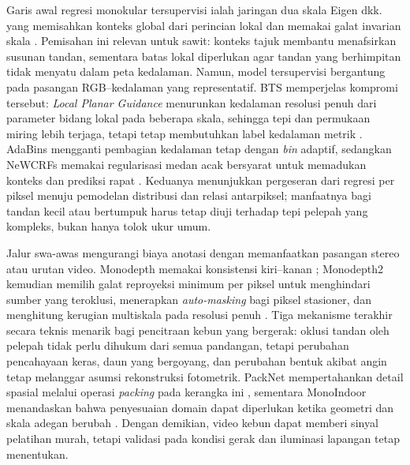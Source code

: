 Garis awal regresi monokular tersupervisi ialah jaringan dua skala Eigen dkk. yang memisahkan konteks global dari perincian lokal dan memakai galat invarian skala \cite{eigen2014depth}. Pemisahan ini relevan untuk sawit: konteks tajuk membantu menafsirkan susunan tandan, sementara batas lokal diperlukan agar tandan yang berhimpitan tidak menyatu dalam peta kedalaman. Namun, model tersupervisi bergantung pada pasangan RGB--kedalaman yang representatif. BTS memperjelas kompromi tersebut: \textit{Local Planar Guidance} menurunkan kedalaman resolusi penuh dari parameter bidang lokal pada beberapa skala, sehingga tepi dan permukaan miring lebih terjaga, tetapi tetap membutuhkan label kedalaman metrik \cite{lee2019bts}. AdaBins mengganti pembagian kedalaman tetap dengan \textit{bin} adaptif, sedangkan NeWCRFs memakai regularisasi medan acak bersyarat untuk memadukan konteks dan prediksi rapat \cite{bhat2021adabins,yuan2022newcrfs}. Keduanya menunjukkan pergeseran dari regresi per piksel menuju pemodelan distribusi dan relasi antarpiksel; manfaatnya bagi tandan kecil atau bertumpuk harus tetap diuji terhadap tepi pelepah yang kompleks, bukan hanya tolok ukur umum.

Jalur swa-awas mengurangi biaya anotasi dengan memanfaatkan pasangan stereo atau urutan video. Monodepth memakai konsistensi kiri--kanan \cite{godard2017monodepth}; Monodepth2 kemudian memilih galat reproyeksi minimum per piksel untuk menghindari sumber yang teroklusi, menerapkan \textit{auto-masking} bagi piksel stasioner, dan menghitung kerugian multiskala pada resolusi penuh \cite{godard2019monodepth2}. Tiga mekanisme terakhir secara teknis menarik bagi pencitraan kebun yang bergerak: oklusi tandan oleh pelepah tidak perlu dihukum dari semua pandangan, tetapi perubahan pencahayaan keras, daun yang bergoyang, dan perubahan bentuk akibat angin tetap melanggar asumsi rekonstruksi fotometrik. PackNet mempertahankan detail spasial melalui operasi \textit{packing} pada kerangka ini \cite{guizilini2020packnet}, sementara MonoIndoor menandaskan bahwa penyesuaian domain dapat diperlukan ketika geometri dan skala adegan berubah \cite{ji2021monoindoor}. Dengan demikian, video kebun dapat memberi sinyal pelatihan murah, tetapi validasi pada kondisi gerak dan iluminasi lapangan tetap menentukan.


